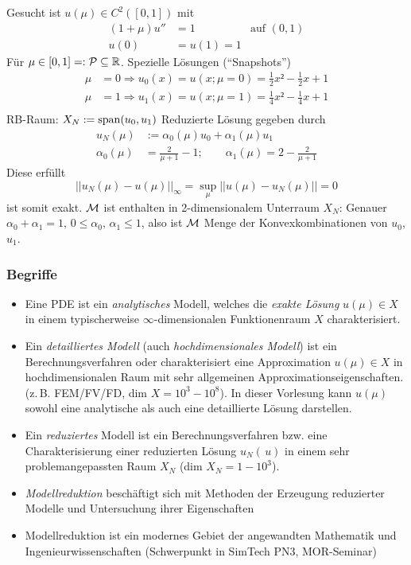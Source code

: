 \begin{bsp}
	Gesucht ist $u(\mu) \in C^2([0,1])$ mit 
	\begin{align*}
		(1 + \mu) u'' &= 1 & \text{auf } (0,1) \\
		u(0) &= u(1) = 1
	\end{align*}
	Für $\mu \in [0,1] =: \mathcal{P} \subseteq \mathbb{R}$. Spezielle Lösungen ("`Snapshots"')
	\begin{align*}
		\mu &= 0 \Rightarrow u_0(x) = u(x; \mu = 0) = \frac{1}{2} x² - \frac{1}{2} x + 1 \\
		\mu &= 1 \Rightarrow u_1(x) = u(x; \mu = 1) = \frac{1}{4} x² - \frac{1}{4} x + 1 \\
	\end{align*}
	RB-Raum: $X_N := \operatorname{span}(u_0,u_1)$
	Reduzierte Lösung gegeben durch
	\begin{align*}
		u_N(\mu) &:= \alpha_0(\mu)u_0 + \alpha_1(\mu)u_1 \\
		\alpha_0 (\mu) &= \frac{2}{\mu + 1} - 1 ; \qquad \alpha_1(\mu) = 2 - \frac{2}{\mu + 1}
	\end{align*}
	Diese erfüllt 
	\[
	 ||u_N(\mu) - u(\mu)||_{\infty} = \sup\limits_{\mu} ||u(\mu) - u_N(\mu)|| = 0
	\]
	ist somit exakt. $\mathcal{M}$ ist enthalten in 2-dimensionalem Unterraum $X_N$: Genauer $\alpha_0 + \alpha_1 = 1,\, 0 \le \alpha_0,\, \alpha_1 \le 1$, also ist $\mathcal{M}$ Menge der Konvexkombinationen von $u_0$, $u_1$.
\end{bsp}

\subsubsection*{Begriffe}
\label{Begriffe}

\begin{itemize}
	\item Eine PDE ist ein \emph{analytisches} Modell, welches die \emph{exakte Lösung} $u(\mu) \in X$ in einem typischerweise $\infty$-dimensionalen Funktionenraum $X$ charakterisiert.
	\item Ein \emph{detailliertes Modell} (auch \emph{hochdimensionales Modell}) ist ein Berechnungsverfahren oder charakterisiert eine Approximation $u(\mu) \in X$ in hochdimensionalen Raum mit sehr allgemeinen Approximationseigenschaften. (z.\,B. FEM/FV/FD, dim $X = 10^3 - 10^8$).
	In dieser Vorlesung kann $u(\mu)$ sowohl eine analytische als auch eine detaillierte Lösung darstellen.
	\item Ein \emph{reduziertes} Modell ist ein Berechnungsverfahren bzw. eine Charakterisierung einer reduzierten Lösung $u_N(\,u)$ in einem sehr problemangepassten Raum $X_N$ (dim $X_N = 1 - 10^3$).
	\item \emph{Modellreduktion} beschäftigt sich mit Methoden der Erzeugung reduzierter Modelle und Untersuchung ihrer Eigenschaften
	\item Modellreduktion ist ein modernes Gebiet der angewandten Mathematik und Ingenieurwissenschaften (Schwerpunkt in SimTech PN3, MOR-Seminar)
\end{itemize}

